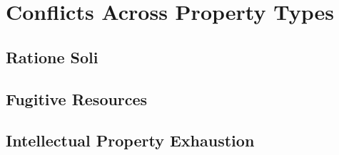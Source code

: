 \chapter{Conflicts Across Property Types}





\section{Ratione Soli}




\section{Fugitive Resources}









\begin{questions}

\end{questions}




\begin{questions}



\end{questions}


\section{Intellectual Property Exhaustion}



\begin{questions}

\end{questions}
